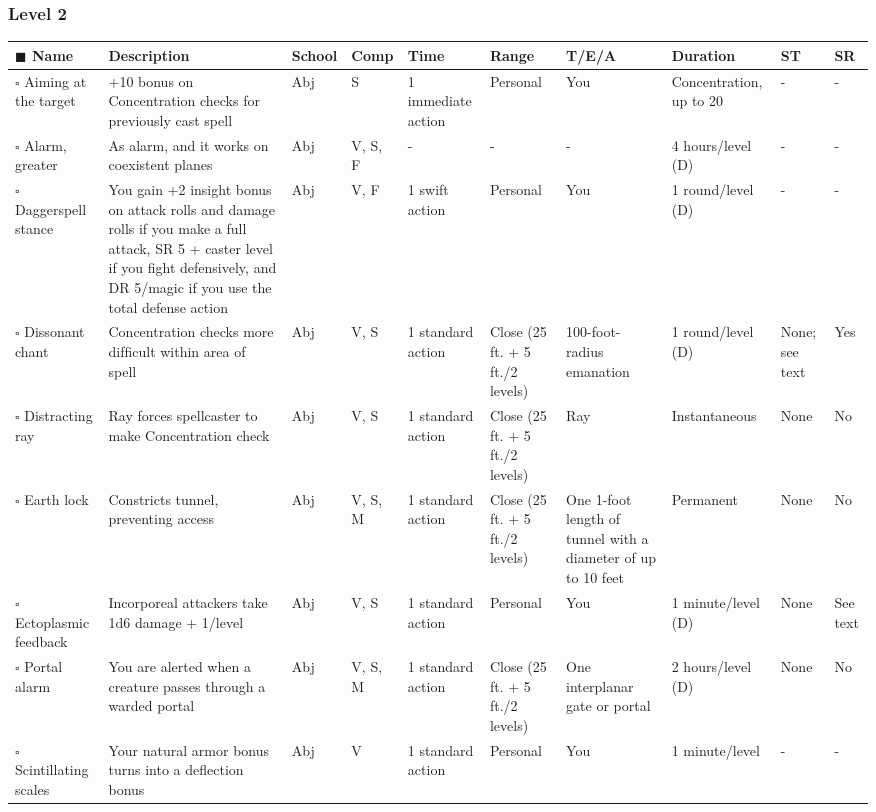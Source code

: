 \documentclass[12pt, a4paper]{article}
\begin{document}
\begin{center}
  \subsubsection*{Level 2}
  \begin{longtable}[H]{ p{8em} p{15em} p{2em} p{5em} p{6em} p{6em} p{10em} p{6em} p{5em} p{2em} }
    \(\blacksquare\) \textbf{Name} & \textbf{Description} & \textbf{School} & \textbf{Comp} & \textbf{Time} & \textbf{Range} & \textbf{T/E/A} & \textbf{Duration} & \textbf{ST} & \textbf{SR}\\
    \endhead
    \(\square\) Aiming at the target & +10 bonus on Concentration checks for previously cast spell & Abj & S & 1 immediate action & Personal & You & Concentration, up to 20  & - & -\\
    \(\square\) Alarm, greater & As alarm, and it works on coexistent planes & Abj & V, S, F & - & - & - & 4 hours/level (D) & - & -\\
    \(\square\) Daggerspell stance & You gain +2 insight bonus on attack rolls and damage rolls if you make a full attack, SR 5 + caster level if you ﬁght defensively, and DR 5/magic if you use the total defense action & Abj & V, F & 1 swift action & Personal & You & 1 round/level (D) & - & -\\
    \(\square\) Dissonant chant & Concentration checks more difﬁcult within area of spell & Abj & V, S & 1 standard action & Close (25 ft. + 5 ft./2 levels) & 100-foot-radius emanation & 1 round/level (D) & None; see text & Yes\\
    \(\square\) Distracting ray & Ray forces spellcaster to make Concentration check & Abj & V, S & 1 standard action & Close (25 ft. + 5 ft./2 levels) & Ray & Instantaneous & None & No\\
    \(\square\) Earth lock & Constricts tunnel, preventing access & Abj & V, S, M & 1 standard action & Close (25 ft. + 5 ft./2 levels) & One 1-foot length of tunnel with a diameter of up to 10 feet & Permanent & None & No\\
    \(\square\) Ectoplasmic feedback & Incorporeal attackers take 1d6 damage + 1/level & Abj & V, S & 1 standard action & Personal & You & 1 minute/level (D) & None & See text\\
    \(\square\) Portal alarm & You are alerted when a creature passes through a warded portal & Abj & V, S, M & 1 standard action & Close (25 ft. + 5 ft./2 levels) & One interplanar gate or portal & 2 hours/level (D) & None & No\\
    \(\square\) Scintillating scales & Your natural armor bonus turns into a deﬂection bonus & Abj & V & 1 standard action & Personal & You & 1 minute/level & - & -\\

\end{longtable}
\end{center}
\end{document}
